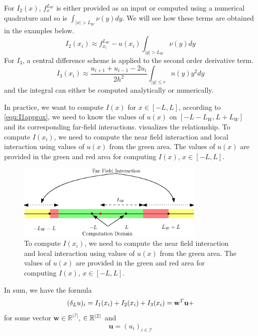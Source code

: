 \documentclass[3p,,preprint,12pt]{elsarticle}
\newcommand{\RR}[0]{\mathbb{R}}
\newcommand{\bw}[0]{\mathbf{w}}
\newcommand{\bu}[0]{\mathbf{u}}
\theoremstyle{definition}
\begin{document}
For $I_2(x)$, $f_x^{L_W}$ is either provided as an input or computed using a numerical quadrature and so is $\int_{|x|>L_W} \nu(y)dy$. We will see how these terms are obtained in the examples below. 
\begin{equation}\label{equ:I2approx}
	I_2(x_i)\approx f_{x_i}^{L_W} - u(x_i)\int_{|y|> L_W}\nu(y)dy
\end{equation}
For $I_3$, a central difference scheme is applied to the second order derivative term. 
\begin{equation}\label{equ:I3approx}
	I_3(x_i)\approx \frac{{{u_{i + 1}} + {u_{i - 1}} - 2{u_i}}}{{2{h^2}}}\int_{|y| \leqslant r} n (y){y^2}dy
\end{equation}
and the integral can either be computed analytically or numerically. 


In practice, we want to compute $I(x)$ for $x\in [-L,L]$, according to \cref{equ:I1approx}, we need to know the values of $u(x)$ on $[-L-L_W,L+L_W]$ and its corresponding far-field interactions.  visualizes the relationship. To compute $I(x_i)$, we need to compute the near field interaction and local interaction using values of $u(x)$ from the green area. The values of $u(x)$ are provided in the green and red area for computing $I(x)$, $x\in [-L, L]$.

\begin{figure}[H] %
\centering
\includegraphics[width=0.8\textwidth,keepaspectratio]{figures/fig31}
\caption{To compute $I(x_i)$, we need to compute the near field interaction and local interaction using values of $u(x)$ from the green area. The values of $u(x)$ are provided in the green and red area for computing $I(x)$, $x\in [-L, L]$.}
\label{fig:fig31}
\end{figure}

In sum, we have the formula
\begin{equation}
	(\delta_L u)_i = I_1(x_i) + I_2(x_i) + I_3(x_i) = \bw^T \bu + \bf
\end{equation}
for some vector $\bw\in \RR^{|\mathcal{I}|}$, $\bf\in \RR^{|\mathcal{I}|}$ and 
\begin{equation}
	\bu = (u_i)_{i\in \mathcal{I}}
\end{equation}
\end{document}
